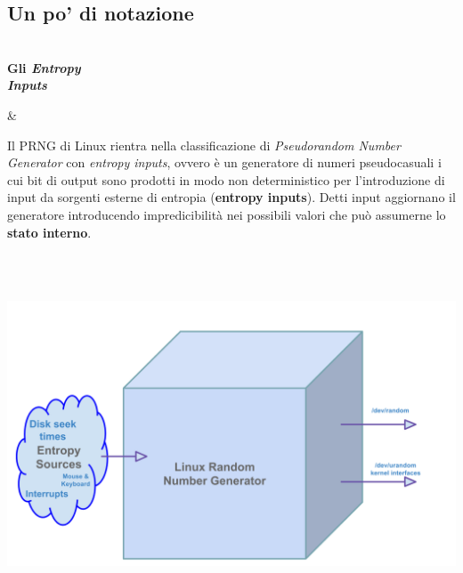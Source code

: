 \documentclass{article}
\newcommand{\knizPar}[3]{%
  \parbox[t]{0.15\textwidth}{\footnotesize
  \textbf{#1\\#2}}&\parbox[t]{0.85\textwidth}{%
    \hspace{1.5em}#3
    \vspace{\parsep}%
  }\\\\}
\begin{document}
 \subsection{Un po' di notazione}\label{notazione}
 \knizPar{}{Gli \emph{Entropy \\Inputs}}{Il PRNG di Linux
 rientra nella classificazione di \emph{Pseudorandom Number Generator} con \emph{entropy inputs}, ovvero è un
 generatore di numeri pseudocasuali i cui bit di output sono prodotti in modo
 non deterministico per l'introduzione di input da sorgenti esterne di entropia
 (\textbf{entropy inputs}). Detti input aggiornano il generatore introducendo
 impredicibilità nei possibili valori che può assumerne lo \textbf{stato
 interno}.}
  \centerline{\includegraphics[width=150mm]{img/entropy_sources.png}}
 
\end{document}
